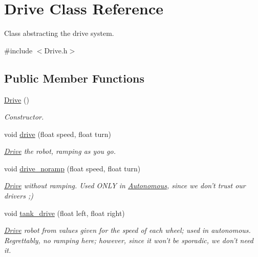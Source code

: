 \hypertarget{class_r_j_f_r_c2011_1_1_drive}{
\section{Drive Class Reference}
\label{class_r_j_f_r_c2011_1_1_drive}
}


Class abstracting the drive system.  




{\ttfamily \#include $<$Drive.h$>$}

\subsection*{Public Member Functions}
\begin{DoxyCompactItemize}
\item 
\hyperlink{class_r_j_f_r_c2011_1_1_drive_a70d21ef3a677f93d143809ccdb43f542}{Drive} ()
\begin{DoxyCompactList}\small\item\em Constructor. \item\end{DoxyCompactList}\item 
void \hyperlink{class_r_j_f_r_c2011_1_1_drive_a45db0398a3b95e7bc3230d1cdf35542c}{drive} (float speed, float turn)
\begin{DoxyCompactList}\small\item\em \hyperlink{class_r_j_f_r_c2011_1_1_drive}{Drive} the robot, ramping as you go. \item\end{DoxyCompactList}\item 
void \hyperlink{class_r_j_f_r_c2011_1_1_drive_a0a15ad6630865e45514115e90e3a712a}{drive\_\-noramp} (float speed, float turn)
\begin{DoxyCompactList}\small\item\em \hyperlink{class_r_j_f_r_c2011_1_1_drive}{Drive} without ramping. Used ONLY in \hyperlink{class_r_j_f_r_c2011_1_1_autonomous}{Autonomous}, since we don't trust our drivers ;) \item\end{DoxyCompactList}\item 
void \hyperlink{class_r_j_f_r_c2011_1_1_drive_aee80f00e9c569ac417d1d38622873fd6}{tank\_\-drive} (float left, float right)
\begin{DoxyCompactList}\small\item\em \hyperlink{class_r_j_f_r_c2011_1_1_drive}{Drive} robot from values given for the speed of each wheel; used in autonomous. Regrettably, no ramping here; however, since it won't be sporadic, we don't need it. \item\end{DoxyCompactList}\item 

\end{DoxyCompactItemize}
